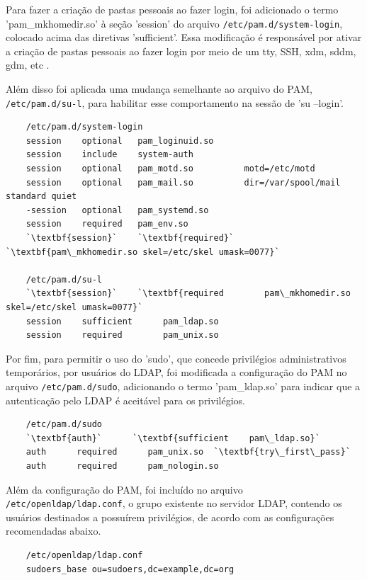 Para fazer a criação de pastas pessoais ao fazer login, foi adicionado o termo 'pam\_mkhomedir.so' à seção 'session' do arquivo \verb|/etc/pam.d/system-login|, colocado acima das diretivas 'sufficient'. Essa modificação é responsável por ativar a criação de pastas pessoais ao fazer login por meio de um tty, SSH, xdm, sddm, gdm, etc \cite{archlinux}. 

Além disso foi aplicada uma mudança semelhante ao arquivo do PAM, \verb|/etc/pam.d/su-l|, para habilitar esse comportamento na sessão de 'su --login'.

\begin{lstlisting}
    /etc/pam.d/system-login 
    session    optional   pam_loginuid.so
    session    include    system-auth
    session    optional   pam_motd.so          motd=/etc/motd
    session    optional   pam_mail.so          dir=/var/spool/mail standard quiet
    -session   optional   pam_systemd.so
    session    required   pam_env.so
    `\textbf{session}`    `\textbf{required}`   `\textbf{pam\_mkhomedir.so skel=/etc/skel umask=0077}`
    
    /etc/pam.d/su-l
    `\textbf{session}`    `\textbf{required        pam\_mkhomedir.so skel=/etc/skel umask=0077}`
    session    sufficient      pam_ldap.so
    session    required        pam_unix.so
\end{lstlisting}

Por fim, para permitir o uso do 'sudo', que concede privilégios administrativos temporários, por usuários do LDAP, foi modificada a configuração do PAM no arquivo \verb|/etc/pam.d/sudo|, adicionando o termo 'pam\_ldap.so' para indicar que a autenticação pelo LDAP é aceitável para os privilégios.

\begin{lstlisting}
    /etc/pam.d/sudo
    `\textbf{auth}`      `\textbf{sufficient    pam\_ldap.so}`
    auth      required      pam_unix.so  `\textbf{try\_first\_pass}`
    auth      required      pam_nologin.so
\end{lstlisting}

Além da configuração do PAM, foi incluído no arquivo \verb|/etc/openldap/ldap.conf|, o grupo existente no servidor LDAP, contendo os usuários destinados a possuírem privilégios, de acordo com as configurações recomendadas abaixo.

\begin{lstlisting}
    /etc/openldap/ldap.conf
    sudoers_base ou=sudoers,dc=example,dc=org
\end{lstlisting}

